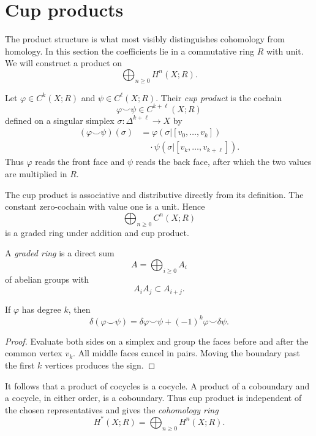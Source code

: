 \section{Cup products}
\label{at-section-cup-products}

\noindent
The product structure is what most visibly
distinguishes cohomology from homology.  In
this section the coefficients lie in a
commutative ring $R$ with unit.  We will
construct a product on
$$
\bigoplus_{n\geq0}H^n(X;R).
$$

\begin{definition}
\label{at-definition-cup-product}
Let $\varphi\in C^k(X;R)$ and
$\psi\in C^\ell(X;R)$.  Their {\it cup
product} is the cochain
$$
\varphi\smile\psi
\in C^{k+\ell}(X;R)
$$
defined on a singular simplex
$\sigma:\Delta^{k+\ell}\to X$ by
$$
\begin{aligned}
(\varphi\smile\psi)(\sigma)
&=
\varphi(\sigma|[v_0,\ldots,v_k])
\\
&\quad\cdot
\psi(\sigma|[v_k,\ldots,v_{k+\ell}]).
\end{aligned}
$$
Thus $\varphi$ reads the front face and
$\psi$ reads the back face, after which the
two values are multiplied in $R$.
\end{definition}

\noindent
The cup product is associative and
distributive directly from its definition.
The constant zero-cochain with value one is
a unit.  Hence
$$
\bigoplus_{n\geq0}C^n(X;R)
$$
is a graded ring under addition and cup
product.

\begin{remark}
\label{at-remark-graded-ring}
A {\it graded ring} is a direct sum
$$
A=\bigoplus_{i\geq0}A_i
$$
of abelian groups with
$$
A_iA_j\subset A_{i+j}.
$$
\end{remark}

\begin{proposition}
\label{at-proposition-cup-leibniz}
If $\varphi$ has degree $k$, then
$$
\delta(\varphi\smile\psi)
=
\delta\varphi\smile\psi
+(-1)^k\varphi\smile\delta\psi.
$$
\end{proposition}

\begin{proof}
Evaluate both sides on a simplex and group
the faces before and after the common
vertex $v_k$.  All middle faces cancel in
pairs.  Moving the boundary past the first
$k$ vertices produces the sign.
\end{proof}

\noindent
It follows that a product of cocycles is a
cocycle.  A product of a coboundary and a
cocycle, in either order, is a coboundary.
Thus cup product is independent of the
chosen representatives and gives the
{\it cohomology ring}
$$
H^*(X;R)
=
\bigoplus_{n\geq0}H^n(X;R).
$$


